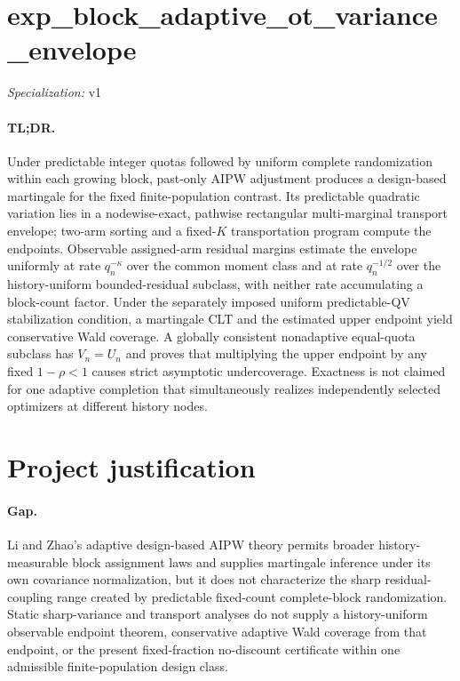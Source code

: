 \documentclass{article}
\begin{document}
\sloppy

\section*{exp\_\allowbreak{}block\_\allowbreak{}adaptive\_\allowbreak{}ot\_\allowbreak{}variance\_\allowbreak{}envelope}

\noindent\textit{Specialization:} v1\par

\paragraph{TL;DR.} Under predictable integer quotas followed by uniform complete randomization within each growing block, past-only AIPW adjustment produces a design-based martingale for the fixed finite-population contrast.  Its predictable quadratic variation lies in a nodewise-exact, pathwise rectangular multi-marginal transport envelope; two-arm sorting and a fixed-\(K\) transportation program compute the endpoints.  Observable assigned-arm residual margins estimate the envelope uniformly at rate \(q_n^{-\kappa}\) over the common moment class and at rate \(q_n^{-1/2}\) over the history-uniform bounded-residual subclass, with neither rate accumulating a block-count factor.  Under the separately imposed uniform predictable-QV stabilization condition, a martingale CLT and the estimated upper endpoint yield conservative Wald coverage.  A globally consistent nonadaptive equal-quota subclass has \(V_n=U_n\) and proves that multiplying the upper endpoint by any fixed \(1-\rho<1\) causes strict asymptotic undercoverage.  Exactness is not claimed for one adaptive completion that simultaneously realizes independently selected optimizers at different history nodes.

\section{Project justification}

\paragraph{Gap.} Li and Zhao's adaptive design-based AIPW theory permits broader history-measurable block assignment laws and supplies martingale inference under its own covariance normalization, but it does not characterize the sharp residual-coupling range created by predictable fixed-count complete-block randomization.  Static sharp-variance and transport analyses do not supply a history-uniform observable endpoint theorem, conservative adaptive Wald coverage from that endpoint, or the present fixed-fraction no-discount certificate within one admissible finite-population design class.
\end{document}

